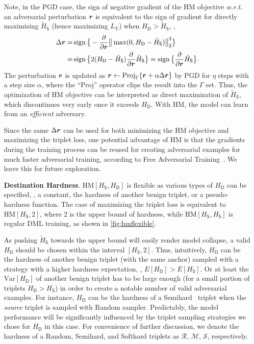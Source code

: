 \documentclass[10pt,twocolumn,letterpaper]{article}
\begin{document}
Note, in the PGD case, the sign of negative gradient of the HM objective
\emph{w.r.t.} an adversarial perturbation ${\bm{r}}$ is equivalent to the sign of
gradient for directly maximizing $\tilde{H}_\mathsf{S}$ (hence
maximizing $L_\text{T}$) when $H_\mathsf{D}>\tilde{H}_\mathsf{S}$, \ie,
%
\begin{align}
	\Delta {\bm{r}}
	=&
	\operatorname{sign}\big\{
		-\frac{\partial}{\partial {\bm{r}}} \big\| \max(0, 
		H_\mathsf{D} - \tilde{H}_\mathsf{S} ) \big\|_2^2
	\big\}
	\\
	=&
	\operatorname{sign}\big\{
		2(H_\mathsf{D} - \tilde{H}_\mathsf{S})
		\frac{\partial }{\partial {\bm{r}}} \tilde{H}_\mathsf{S} \big\}
	=
	\operatorname{sign}\big\{
		\frac{\partial}{\partial {\bm{r}}} \tilde{H}_\mathsf{S}
		\big\}.
\end{align}
%
The perturbation ${\bm{r}}$ is updated as ${\bm{r}} \leftarrow \text{Proj}_\Gamma\{{\bm{r}} + \alpha \Delta
{\bm{r}}\}$ by PGD for $\eta$ steps with a step size $\alpha$, where the ``Proj'' operator
clips the result into the $\Gamma$ set.
%
Thus, the optimization of HM objective can be interpreted as direct
maximization of $\tilde{H}_\mathsf{S}$, which discontinues very early once it
exceeds $H_\mathsf{D}$.
%
With HM, the model can learn from an \emph{efficient} adversary.

Since the same $\Delta{\bm{r}}$ can be used for both minimizing the HM objective
and maximizing the triplet loss, one potential advantage of HM is that
the gradients during the training process can be reused for creating
adversarial examples for much faster adversarial training, according to 
Free Adversarial Training~\cite{freeat}.
%
We leave this for future exploration.


\textbf{Destination Hardness}.
%
$\text{HM}[H_\mathsf{S},H_\mathsf{D}]$ is flexible as various
types of $H_\mathsf{D}$ can be specified, \eg, a constant, the
hardness of another benign triplet, or a pseudo-hardness function.
%
The case of maximizing the triplet loss is equivalent to
$\text{HM}[H_\mathsf{S},2]$, where $2$ is the 
upper bound of hardness, while $\text{HM}[H_\mathsf{S},H_\mathsf{S}]$
is regular DML training, as shown in \cref{fig:hmflexible}.

As pushing $\tilde{H}_\mathsf{S}$ towards the upper bound will easily render
model collapse, a valid $H_\mathsf{D}$ should be chosen within the interval
$[H_\mathsf{S},2]$.
%
Thus, intuitively, $H_\mathsf{D}$ can be the hardness of another benign triplet
(with the same anchor) sampled with a strategy with a higher hardness
expectation, \ie, $E[H_\mathsf{D}] > E[H_\mathsf{S}]$.
%
Or at least the $\text{Var}[H_\mathsf{D}]$ of another benign triplet has to
be large enough (for a small portion of triplets $H_\mathsf{D}>H_\mathsf{S}$)
in order to create a notable number of valid adversarial
examples.
%
For instance, $H_\mathsf{D}$ can be the hardness of a Semihard~\cite{facenet}
triplet when the \emph{source} triplet is sampled with Random sampler.
%
Predictably, the model performance will be significantly influenced by the
triplet sampling strategies we chose for $H_\mathsf{D}$ in this case.
%
For convenience of further discussion, we denote the hardness of a Random,
Semihard, and Softhard triplets as $\mathcal{R}$, $\mathcal{M}$, $\mathcal{S}$,
respectively.
\end{document}
